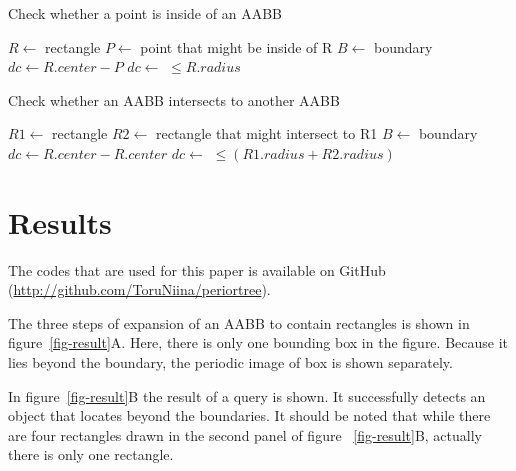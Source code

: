 \documentclass[10pt,letterpaper,twocolumn]{article}
\begin{document}
\begin{algorithm}[tbh]
    \caption{Check whether a point is inside of an AABB}
    \begin{algorithmic}
        \State $R \gets$ rectangle
        \State $P \gets$ point that might be inside of R
        \State $B \gets$ boundary
            \State $dc \gets R.center - P$
            \State $dc \gets$ 
            \State \Return {} $\leq R.radius$
        \EndFunction
     \end{algorithmic}
\end{algorithm}

\begin{algorithm}[tbh]
    \caption{Check whether an AABB intersects to another AABB}
    \begin{algorithmic}
        \State $R1 \gets$ rectangle
        \State $R2 \gets$ rectangle that might intersect to R1
        \State $B  \gets$ boundary
            \State $dc \gets R.center - R.center$
            \State $dc \gets$ 
            \State \Return {} $\leq (R1.radius + R2.radius)$
        \EndFunction
     \end{algorithmic}
\end{algorithm}

\section*{Results}

The codes that are used for this paper is available on GitHub
(\url{http://github.com/ToruNiina/periortree}).

The three steps of expansion of an AABB to contain rectangles is shown in
figure~\ref{fig-result}A.
Here, there is only one bounding box in the figure.
Because it lies beyond the boundary, the periodic image of box is shown separately.

In figure~\ref{fig-result}B the result of a query is shown. It successfully
detects an object that locates beyond the boundaries. It should be noted that
while there are four rectangles drawn in the second panel of figure
~\ref{fig-result}B, actually there is only one rectangle.
\end{document}
